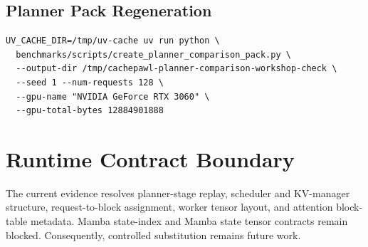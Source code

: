 \documentclass[10pt]{article}
\begin{document}
\subsection{Planner Pack Regeneration}

\begin{verbatim}
UV_CACHE_DIR=/tmp/uv-cache uv run python \
  benchmarks/scripts/create_planner_comparison_pack.py \
  --output-dir /tmp/cachepawl-planner-comparison-workshop-check \
  --seed 1 --num-requests 128 \
  --gpu-name "NVIDIA GeForce RTX 3060" \
  --gpu-total-bytes 12884901888
\end{verbatim}

\section{Runtime Contract Boundary}

The current evidence resolves planner-stage replay, scheduler and KV-manager
structure, request-to-block assignment, worker tensor layout, and attention
block-table metadata. Mamba state-index and Mamba state tensor contracts remain
blocked. Consequently, controlled substitution remains future work.
\end{document}
